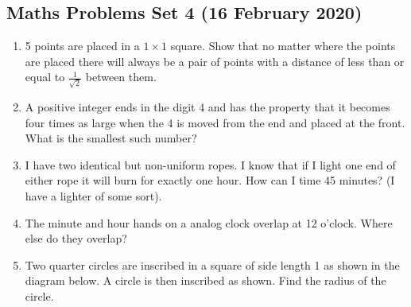 \documentclass{article}
\begin{document}
\begin{center}
        \section*{Maths Problems Set 4 (16 February 2020)}
\end{center}

\begin{enumerate}
    \item
    5 points are placed in a $1\times1$ square. Show that no matter where the points are placed there will always be a pair of points with a distance of less than or equal to $\frac{1}{\sqrt{2}}$ between them.

    
    \item
    A positive integer ends in the digit 4 and has the property that it becomes four times as large when the 4 is moved from the end and placed at the front. What is the smallest such number?
    
    \item
    I have two identical but non-uniform ropes. I know that if I light one end of either rope it will burn for exactly one hour. How can I time 45 minutes? (I have a lighter of some sort).
    
    \item
    The minute and hour hands on a analog clock overlap at 12 o’clock. Where else do they overlap?
    
    \item
    Two quarter circles are inscribed in a square of side length 1 as shown in the diagram below. A circle is then inscribed as shown. Find the radius of the circle.
    
    

\end{enumerate}
\end{document}
